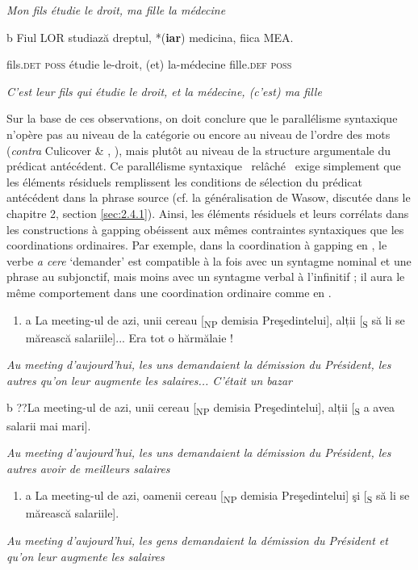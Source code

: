     \textit{Mon fils étudie le droit, ma fille la médecine } 

  b  Fiul LOR studiază dreptul, *(\textbf{iar}) medicina, fiica MEA.

    fils.\textsc{det poss} étudie le-droit, (et) la-médecine fille\textsc{.def poss}

    \textit{C'est leur fils qui étudie le droit, et la médecine, (c'est) ma fille} 

Sur la base de ces observations, on doit conclure que le parallélisme syntaxique n'opère pas au niveau de la catégorie ou encore au niveau de l'ordre des mots (\textit{contra} Culicover \& \citet{Jackendoff2005}, \citet{Culicover2009}), mais plutôt au niveau de la structure argumentale du prédicat antécédent. Ce parallélisme syntaxique {\guillemotleft}~relâché~{\guillemotright} exige simplement que les éléments résiduels remplissent les conditions de sélection du prédicat antécédent dans la phrase source (cf. la généralisation de Wasow, discutée dans le chapitre 2, section \ref{sec:2.4.1}). Ainsi, les éléments résiduels et leurs corrélats dans les constructions à gapping obéissent aux mêmes contraintes syntaxiques que les coordinations ordinaires. Par exemple, dans la coordination à gapping en , le verbe \textit{a cere} `demander' est compatible à la fois avec un syntagme nominal et une phrase au subjonctif, mais moins avec un syntagme verbal à l'infinitif ; il aura le même comportement dans une coordination ordinaire comme en .  


\begin{enumerate}
\item \label{bkm:Ref290554010}a  La meeting-ul de azi, unii cereau [\textsubscript{NP} demisia Preşedintelui], alții [\textsubscript{S} să li se mărească salariile]... Era tot o hărmălaie !


\end{enumerate}
{\itshape
Au meeting d'aujourd'hui, les uns demandaient la démission du Président, les autres qu'on leur augmente les salaires... C'était un bazar } 

  b  ??La meeting-ul de azi, unii cereau [\textsubscript{NP} demisia Preşedintelui], alții [\textsubscript{S} a avea salarii mai mari].

{\itshape
Au meeting d'aujourd'hui, les uns demandaient la démission du Président, les autres avoir de meilleurs salaires } 


\begin{enumerate}
\item \label{bkm:Ref290554068}a  La meeting-ul de azi, oamenii cereau [\textsubscript{NP} demisia Preşedintelui] şi [\textsubscript{S} să li se mărească salariile].


\end{enumerate}
{\itshape
Au meeting d'aujourd'hui, les gens demandaient la démission du Président et qu'on leur augmente les salaires}

